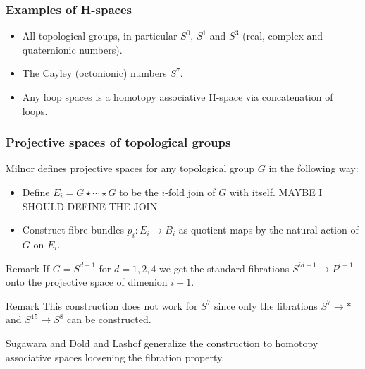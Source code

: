 \documentclass{beamer}
\theoremstyle{definition}
\begin{document}
\begin{frame}
\frametitle{Examples of H-spaces}
\begin{itemize}
\item<1-> All topological groups, in particular $S^0$, $S^1$ and $S^3$ (real, complex and quaternionic numbers).
\item<2-> The Cayley (octonionic) numbers $S^7$.
\item<3-> Any loop spaces is a homotopy associative H-space via concatenation of loops.
\end{itemize}
	
\end{frame}

\begin{frame}
\frametitle{Projective spaces of topological groups}
Milnor defines projective spaces for any topological group $G$ in the following way:\pause
\begin{itemize}
\item<2-> Define $E_i=G\star\cdots\star G$ to be the $i$-fold join of $G$ with itself. MAYBE I SHOULD DEFINE THE JOIN
\item<2-> Construct fibre bundles $p_i:E_i\to B_i$ as quotient maps by the natural action of $G$ on $E_i$.
\end{itemize}\pause
\begin{block}{Remark}
If $G=S^{d-1}$ for $d=1,2,4$ we get the standard fibrations $S^{id-1}\to P^{i-1}$ onto the projective space of dimenion $i-1$.
\end{block}
\end{frame}

\begin{frame}
\begin{block}{Remark}
This construction does not work for $S^7$ since only the fibrations $S^7\to *$ and $S^{15}\to S^8$ can be constructed.
\end{block}\pause


Sugawara and Dold and Lashof generalize the construction to homotopy associative spaces loosening the fibration property.
\end{frame}
\end{document}
